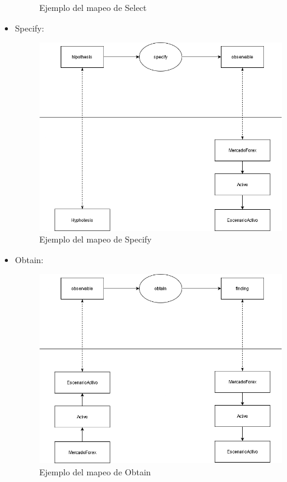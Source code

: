 \begin{itemize}
\begin{figure}[H]
    \caption{\label{fig:Select}Ejemplo del mapeo de Select}
  \end{figure}
  \item Specify: 
  \begin{figure}[H]
    \centering
    \includegraphics[scale=0.50]{imagenes/specify.png}
    \caption{\label{fig:Specify}Ejemplo del mapeo de Specify}
  \end{figure}
  \item Obtain:  
  \begin{figure}[H]
    \centering
    \includegraphics[scale=0.50]{imagenes/Obtain.png}
    \caption{\label{fig:Obtain}Ejemplo del mapeo de Obtain}
  \end{figure}

\end{itemize}
